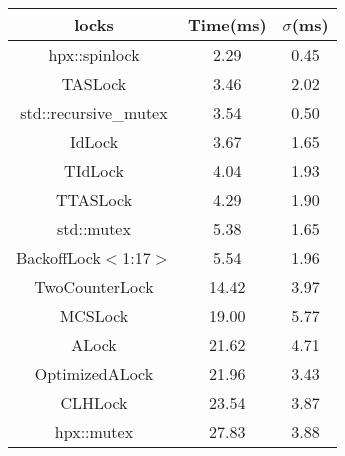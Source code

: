 \begin{tabular}{|c|c|c|}
\hline
\textbf{locks} & \textbf{Time(ms)} & \textbf{$\sigma$(ms)} \\
\hline
hpx::spinlock & 2.29 & 0.45 \\
\hline
TASLock & 3.46 & 2.02 \\
\hline
std::recursive\_mutex & 3.54 & 0.50 \\
\hline
IdLock & 3.67 & 1.65 \\
\hline
TIdLock & 4.04 & 1.93 \\
\hline
TTASLock & 4.29 & 1.90 \\
\hline
std::mutex & 5.38 & 1.65 \\
\hline
BackoffLock$<$1:17$>$ & 5.54 & 1.96 \\
\hline
TwoCounterLock & 14.42 & 3.97 \\
\hline
MCSLock & 19.00 & 5.77 \\
\hline
ALock & 21.62 & 4.71 \\
\hline
OptimizedALock & 21.96 & 3.43 \\
\hline
CLHLock & 23.54 & 3.87 \\
\hline
hpx::mutex & 27.83 & 3.88 \\
\hline
\end{tabular}
